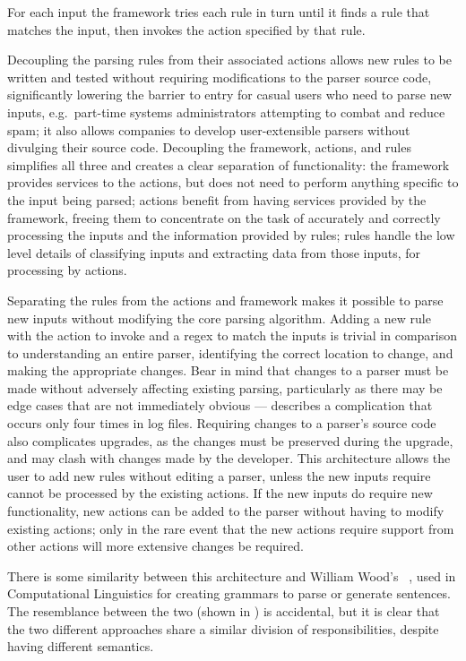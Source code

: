 For each input the framework tries each rule in turn until it finds a rule
that matches the input, then invokes the action specified by that rule.

\label{why separate rules, actions, and framework?}

Decoupling the parsing rules from their associated actions allows new rules
to be written and tested without requiring modifications to the parser
source code, significantly lowering the barrier to entry for casual users
who need to parse new inputs, e.g.\ part-time systems administrators
attempting to combat and reduce spam; it also allows companies to develop
user-extensible parsers without divulging their source code.  Decoupling
the framework, actions, and rules simplifies all three and creates a clear
separation of functionality: the framework provides services to the
actions, but does not need to perform anything specific to the input being
parsed; actions benefit from having services provided by the framework,
freeing them to concentrate on the task of accurately and correctly
processing the inputs and the information provided by rules; rules handle
the low level details of classifying inputs and extracting data from those
inputs, for processing by actions.

Separating the rules from the actions and framework makes it possible to
parse new inputs without modifying the core parsing algorithm.  Adding a
new rule with the action to invoke and a regex to match the inputs is
trivial in comparison to understanding an entire parser, identifying the
correct location to change, and making the appropriate changes.  Bear in
mind that changes to a parser must be made without adversely affecting
existing parsing, particularly as there may be edge cases that are not
immediately obvious --- 
describes a complication that occurs only four times in \numberOFlogFILES{}
log files.  Requiring changes to a parser's source code also complicates
upgrades, as the changes must be preserved during the upgrade, and may
clash with changes made by the developer.  This architecture allows the
user to add new rules without editing a parser, unless the new inputs
require cannot be processed by the existing actions.  If the new inputs do
require new functionality, new actions can be added to the parser without
having to modify existing actions; only in the rare event that the new
actions require support from other actions will more extensive changes be
required.

There is some similarity between this architecture and William Wood's
~\cite{atns,nlpip}, used in Computational Linguistics for
creating grammars to parse or generate sentences.  The resemblance between
the two (shown in ) is accidental, but it is clear that the two different
approaches share a similar division of responsibilities, despite having
different semantics.

